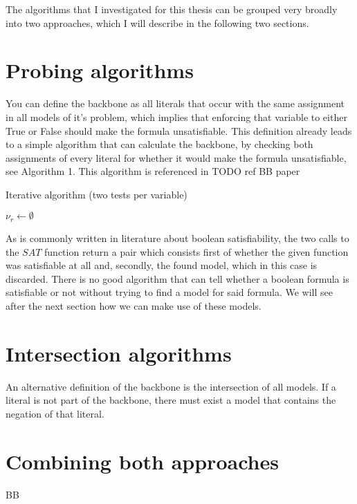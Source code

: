The algorithms that I investigated for this thesis can be grouped very broadly into two approaches, which I will describe in the following two sections.


\section{Probing algorithms}
You can define the backbone as all literals that occur with the same assignment in all models of it's problem, which implies that enforcing that variable to either True or False should make the formula unsatisfiable. This definition already leads to a simple algorithm that can calculate the backbone, by checking both assignments of every literal for whether it would make the formula unsatisfiable, see Algorithm 1. This algorithm is referenced in TODO ref BB paper
\begin{algorithm}
\caption{{\sc Iterative algorithm (two tests per variable)}}
\DontPrintSemicolon
{}
$\nu_r \gets \emptyset$\;
\;

\end{algorithm}

As is commonly written in literature about boolean satisfiability, the two calls to the $SAT$ function return a pair which consists first of whether the given function was satisfiable at all and, secondly, the found model, which in this case is discarded. There is no good algorithm that can tell whether a boolean formula is satisfiable or not without trying to find a model for said formula. We will see after the next section how we can make use of these models.


\section{Intersection algorithms}
An alternative definition of the backbone is the intersection of all models. If a literal is not part of the backbone, there must exist a model that contains the negation of that literal.


\section{Combining both approaches}

BB